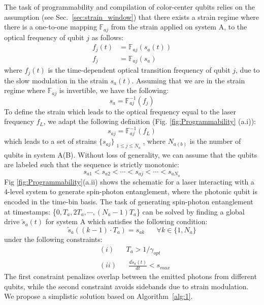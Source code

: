 \documentclass[%
 reprint,
 superscriptaddress,
 amsmath,amssymb,
 aps,
 prx,
]{revtex4-2}
\begin{document}
The task of programmability and compilation of color-center qubits relies on the assumption (see Sec.~\ref{sec:strain_window}) that there exists a strain regime where there is a one-to-one mapping $\mathbb{F}_{aj}$ from the strain applied on system A, to the optical frequency of qubit $j$ as follows:
\begin{equation}
    \begin{split}
        f_{j}(t) &= \mathbb{F}_{aj}(s_{a}(t))\\ 
        f_{j} &= \mathbb{F}_{aj}(s_{a})
    \end{split}
\end{equation}
where $f_{j}(t)$ is the time-dependent optical transition frequency of qubit $j$, due to the slow modulation in the strain $s_{a}(t)$. Assuming that we are in the strain regime where $\mathbb{F}_{aj}$ is invertible, we have the following:
\begin{equation}
    s_{a} = \mathbb{F}_{aj}^{-1}(f_{j})
\end{equation}
To define the strain which leads to the optical frequency equal to the laser frequency $f_{L}$, we adapt the following definition (Fig. \ref{fig:Programmability} (a.i)):
\begin{equation}
    s_{aj} = \mathbb{F}_{aj}^{-1}(f_{L})
\end{equation}
which leads to a set of strains $\{s_{aj}\}_{\substack{1\le j \le N_{a}}}$, where $N_{a(b)}$ is the number of qubits in system A(B). Without loss of generality, we can assume that the qubits are labeled such that the sequence is strictly monotonic:
\begin{equation}
    s_{a1} < s_{a2} <  \cdots < s_{aj} < \cdots < s_{aN_{a}}
\end{equation}
Fig \ref{fig:Programmability}(a.ii) shows the schematic for a laser interacting with a 4-level system to generate spin-photon entanglement, where the photonic qubit is encoded in the time-bin basis. The task of generating spin-photon entanglement at timestamps: \{$0, T_{a}, 2T_{a}, \cdots, (N_{a}-1)T_{a}$\} can be solved by finding a global drive $\tilde{s}_{a}(t)$ for system A which satisfies the following condition:
\begin{equation}
    \tilde{s}_{a}((k-1)\cdot T_{a}) = s_{ak}\hspace{20pt} \forall k\in\{1,N_{a}\}
\end{equation}
under the following constraints:
\begin{equation}
    \begin{split}
        &(i) \hspace{20pt} T_{a} > 1/\gamma_{opt}\\
        &(ii) \hspace{20pt} \frac{d\tilde{s}_{a}(t)}{dt} < s_{max}
    \end{split}
\end{equation}
The first constraint penalizes overlap between the emitted photons from different qubits, while the second constraint avoids sidebands due to strain modulation. We propose a simplistic solution based on Algorithm~\ref{alg:1}.
\end{document}
